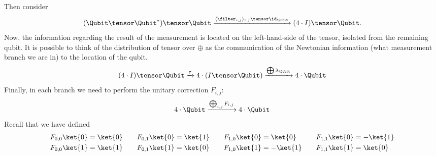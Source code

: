 Then consider
\[  (\Qubit \tensor \Qubit^*) \tensor \Qubit
    \xrightarrow{\langle \filter_{i,j} \rangle_{i,j} \tensor \id_\Qubit} 
    (4 \cdot I) \tensor \Qubit. 
\]
Now, the information regarding the result of the measurement is located on the left-hand-side of the tensor,
isolated from the remaining qubit. It is possible to think of the distribution of
tensor over $\oplus$ as the communication of the Newtonian information (what measurement
branch we are in) to the location of the qubit. 
\[
    (4 \cdot I) \tensor \Qubit
    \xrightarrow{ \tau }
    4 \cdot (I \tensor \Qubit) 
    \xrightarrow{ \bigoplus \lambda_\Qubit}
    4 \cdot \Qubit
\]
Finally, in each branch we need to perform the unitary correction $F_{i,j}$:
\[
    4 \cdot \Qubit
    \xrightarrow{ \bigoplus_{i,j} F_{i,j} }
    4 \cdot \Qubit
\]
Recall that we have defined
\begin{align*}
\begin{aligned}
    F_{0,0} \ket{0} &= \ket{0} \\
    F_{0,0} \ket{1} &= \ket{1} 
\end{aligned}
\qquad
\begin{aligned}
    F_{0,1} \ket{0} &= \ket{1} \\
    F_{0,1} \ket{1} &= \ket{0} 
\end{aligned}
\qquad
\begin{aligned}
    F_{1,0} \ket{0} &= \ket{0} \\
    F_{1,0} \ket{1} &= -\ket{1} 
\end{aligned}
\qquad
\begin{aligned}
    F_{1,1} \ket{0} &= -\ket{1} \\
    F_{1,1} \ket{1} &= \ket{0} 
\end{aligned}
\end{align*}

